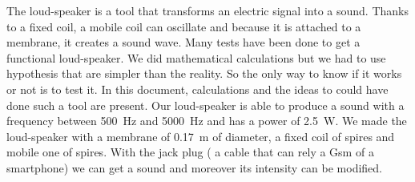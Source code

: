 

\begin{abstract-en}
The loud-speaker is a tool that transforms an electric signal into a sound.  Thanks to a fixed coil, a mobile coil can oscillate and because it is attached to a membrane, it creates a sound wave.  
Many tests have been done to get a functional loud-speaker.  We did mathematical calculations but we had to use hypothesis that are simpler than the reality.  So the only way to know if it works or not is to test it.
In this document, calculations and the ideas to could have done such a tool are present.  
Our loud-speaker is able to produce a sound with a frequency between \SI{500}{\hertz} and \SI{5000}{\hertz} and has a power of \SI{2.5}{\watt}.  We made the loud-speaker with a membrane of \SI{0.17}{\meter} of diameter, a fixed coil of  spires and mobile one of  spires.  With the jack plug ( a cable that can rely a Gsm of a smartphone) we can get a sound and moreover its intensity can be modified.
\end{abstract-en}


